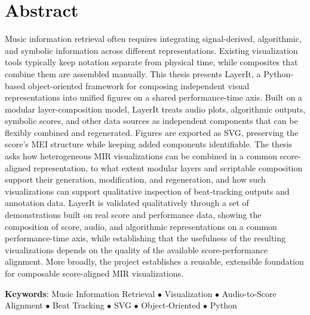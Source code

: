 
\chapter*{Abstract}

Music information retrieval often requires integrating signal-derived, algorithmic, and symbolic information across different representations. Existing visualization tools typically keep notation separate from physical time, while composites that combine them are assembled manually. This thesis presents LayerIt, a Python-based object-oriented framework for composing independent visual representations into unified figures on a shared performance-time axis. Built on a modular layer-composition model, LayerIt treats audio plots, algorithmic outputs, symbolic scores, and other data sources as independent components that can be flexibly combined and regenerated. Figures are exported as SVG, preserving the score's MEI structure while keeping added components identifiable. The thesis asks how heterogeneous MIR visualizations can be combined in a common score-aligned representation, to what extent modular layers and scriptable composition support their generation, modification, and regeneration, and how such visualizations can support qualitative inspection of beat-tracking outputs and annotation data. LayerIt is validated qualitatively through a set of demonstrations built on real score and performance data, showing the composition of score, audio, and algorithmic representations on a common performance-time axis, while establishing that the usefulness of the resulting visualizations depends on the quality of the available score-performance alignment. More broadly, the project establishes a reusable, extensible foundation for composable score-aligned MIR visualizations.

\vspace{\fill}
\begin{flushleft}
{\Large \textbf{Keywords}:} 
Music Information Retrieval \(\bullet\)
Visualization \(\bullet\)
Audio-to-Score Alignment \(\bullet\)
Beat Tracking \(\bullet\)
SVG \(\bullet\)
Object-Oriented \(\bullet\)
Python
\end{flushleft}
\vspace*{24mm}

\acresetall %
